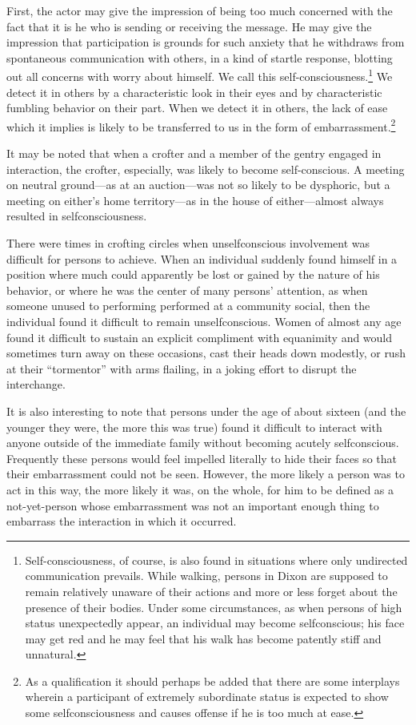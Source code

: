 \documentclass[openany,nobib]{tufte-book}
\begin{document}
First, the actor may give the impression of being too much concerned
with the fact that it is he who is sending or receiving the message. He
may give the impression that participation is grounds for such anxiety
that he withdraws from spontaneous communication with others, in a kind
of startle response, blotting out all concerns with worry about himself.
We call this self-consciousness.\footnote{Self-consciousness, of course,
  is also found in situations where only undirected communication
  prevails. While walking, persons in Dixon are supposed to remain
  relatively unaware of their actions and more or less forget about the
  presence of their bodies. Under some circumstances, as when persons of
  high status unexpectedly appear, an individual may become
  selfconscious; his face may get red and he may feel that his walk has
  become patently stiff and unnatural.} We detect it in others by a
characteristic look in their eyes and by characteristic fumbling
behavior on their part. When we detect it in others, the lack of ease
which it implies is likely to be transferred to us in the form of
embarrassment.\footnote{As a qualification it should perhaps be added
  that there are some interplays wherein a participant of extremely
  subordinate status is expected to show some selfconsciousness and
  causes offense if he is too much at ease.}

It may be noted that when a crofter and a member of the gentry engaged
in interaction, the crofter, especially, was likely to become
self-conscious. A meeting on neutral ground---as at an auction---was not
so likely to be dysphoric, but a meeting on either's home territory---as
in the house of either---almost always resulted in selfconsciousness.

There were times in crofting circles when unselfconscious involvement
was difficult for persons to achieve. When an individual suddenly found
himself in a position where much could apparently be lost or gained by
the nature of his behavior, or where he was the center of many persons'
attention, as when someone unused to performing performed at a community
social, then the individual found it difficult to remain
unselfconscious. Women of almost any age found it difficult to sustain
an explicit compliment with equanimity and would sometimes turn away on
these occasions, cast their heads down modestly, or rush at their
``tormentor'' with arms flailing, in a joking effort to disrupt the
interchange.

It is also interesting to note that persons under the age of about
sixteen (and the younger they were, the more this was true) found it
difficult to interact with anyone outside of the immediate family
without becoming acutely selfconscious. Frequently these persons would
feel impelled literally to hide their faces so that their embarrassment
could not be seen. However, the more likely a person was to act in this
way, the more likely it was, on the whole, for him to be defined as a
not-yet-person whose embarrassment was not an important enough thing to
embarrass the interaction in which it occurred.
\end{document}
